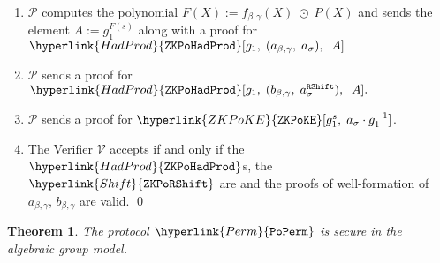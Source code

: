 \documentclass[11pt, lettersize, notitlepage, leqno, footskip=0.6cm]{article}
\newcommand{\mc}{\mathcal}
\newcommand{\be}{\beta}
\newcommand{\mP}{\mc{P}}
\newcommand{\V}{\mc{V}}
\newtheorem{Thm}{Theorem}[section]
\numberwithin{equation}{section}
\begin{document}
\begin{mdframed}
\begin{enumerate}[wide, labelwidth=!, labelindent=0pt, itemsep=-0.2ex]
\item $\mP$ computes the polynomial $F(X):= f_{\be,\gamma}(X)\;\odot\; P(X)$ and sends the element $A:= g_1^{F(s)}$ along with a proof for $\hyperlink{HadProd}{\tt{ZKPoHadProd}}[g_1,\;({a}_{\be,\gamma},\;a_{\sigma}),\;\;A] $
 
\item $\mP$ sends a proof for $\hyperlink{HadProd}{\tt{ZKPoHadProd}}[g_1,\;({b}_{\be,\gamma},\;a^{{\tt{RShift}}}_{\sigma}),\;\;A] .$ 
 
\item $\mP$ sends a proof for $\hyperlink{ZKPoKE}{\tt{ZKPoKE}}[g_1^{s},\;a_{\sigma}\cdot g_1^{-1}]$. 

\item The Verifier $\V$ accepts if and only if the $\hyperlink{HadProd}{\tt{ZKPoHadProd}}$s, the $\hyperlink{Shift}{\tt{ZKPoRShift}}$ are and the proofs of well-formation of $a_{\be,\gamma}$, $b_{\be,\gamma}$ are valid.  \qed \end{enumerate} \end{mdframed} 


\bigskip

\begin{Thm} The protocol $\hyperlink{Perm}{\tt{PoPerm}}$ is secure in the algebraic group model. \end{Thm}
\end{document}
